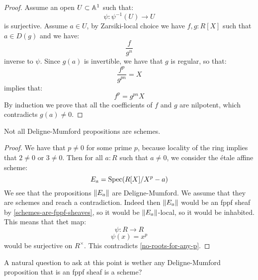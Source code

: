 \begin{proof}
Assume an open $U\subset \mathbb{A}^1$ such that:
\[\psi: \psi^{-1}(U) \to U\]
is surjective. Assume $a\in U$, by Zarsiki-local choice we have $f,g:R[X]$ such that $a\in D(g)$ and we have:
\[\frac{f}{g^n}\]
inverse to $\psi$. Since $g(a)$ is invertible, we have that $g$ is regular, so that:
\[\frac{f^p}{g^{pn}} = X\]
implies that:
\[f^p = g^{pn}X\]
By induction we prove that all the coefficients of $f$ and $g$ are nilpotent, which contradicts $g(a)\not=0$.
\end{proof}

\begin{proposition}
Not all Deligne-Mumford propositions are schemes.
\end{proposition}

\begin{proof}
We have that $p\not=0$ for some prime $p$, because locality of the ring implies that $2\not=0$ or $3\not=0$. Then for all $a:R$ such that $a\not=0$, we consider the étale affine scheme:
\[E_a = \operatorname{Spec}(R[X]/X^p-a)\]
We see that the propositions $\lVert E_a \rVert$ are Deligne-Mumford. We assume that they are schemes and reach a contradiction. Indeed then $\lVert E_a \rVert$ would be an fppf sheaf by \cref{schemes-are-fppf-sheaves}, so it would be $\lVert E_a \rVert$-local, so it would be inhabited. This means that thet map:
\[\psi:R\to R\]
\[\psi(x)=x^p\]
would be surjective on $R^\times$. This contradicts \cref{no-roots-for-any-p}.
\end{proof}

A natural question to ask at this point is wether any Deligne-Mumford proposition that is an fppf sheaf is a scheme?

